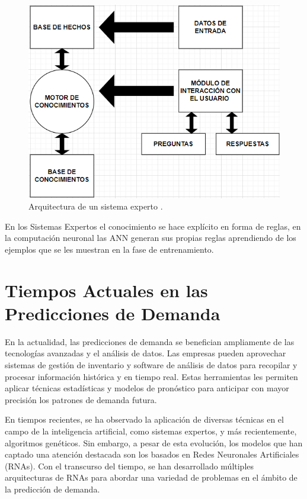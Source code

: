 \begin{figure}[H]
  \begin{center}
    \includegraphics[scale=0.90]{./hechos.png}
    \caption{Arquitectura de un sistema experto \cite{diez2001introduccion}.}
    \label{fig:Arquitectura de un sistema experto}
  \end{center}
\end{figure}




En los Sistemas Expertos el conocimiento se hace explícito en forma de reglas, en la computación neuronal las ANN generan sus propias reglas aprendiendo de los ejemplos que se les muestran en la fase de entrenamiento\cite{olabe1998redes}. 



\section{Tiempos Actuales en las Predicciones de Demanda}

En la actualidad, las predicciones de demanda se benefician ampliamente de las tecnologías avanzadas y el análisis de datos. Las empresas pueden aprovechar sistemas de gestión de inventario y software de análisis de datos para recopilar y procesar información histórica y en tiempo real. Estas herramientas les permiten aplicar técnicas estadísticas y modelos de pronóstico para anticipar con mayor precisión los patrones de demanda futura.

En tiempos recientes, se ha observado la aplicación de diversas técnicas en el campo de la inteligencia artificial, como sistemas expertos, y más recientemente, algoritmos genéticos. Sin embargo, a pesar de esta evolución, los modelos que han captado una atención destacada son los basados en Redes Neuronales Artificiales (RNAs). Con el transcurso del tiempo, se han desarrollado múltiples arquitecturas de RNAs para abordar una variedad de problemas en el ámbito de la predicción de demanda.

